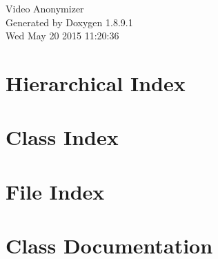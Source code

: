 \documentclass[twoside]{book}
\newcommand{\+}{\discretionary{\mbox{\scriptsize$\hookleftarrow$}}{}{}}
\newcommand{\clearemptydoublepage}{%
  \newpage{\pagestyle{empty}\cleardoublepage}%
}
\begin{document}
\hypersetup{pageanchor=false,
             bookmarks=true,
             bookmarksnumbered=true,
             pdfencoding=unicode
            }
\begin{titlepage}
\vspace*{7cm}
\begin{center}%
{\Large Video Anonymizer }\\
\vspace*{1cm}
{\large Generated by Doxygen 1.8.9.1}\\
\vspace*{0.5cm}
{\small Wed May 20 2015 11:20:36}\\
\end{center}
\end{titlepage}
\clearemptydoublepage
\tableofcontents
\clearemptydoublepage
{}
\hypersetup{pageanchor=true}

\chapter{Hierarchical Index}

\chapter{Class Index}

\chapter{File Index}

\chapter{Class Documentation}


























\end{document}
